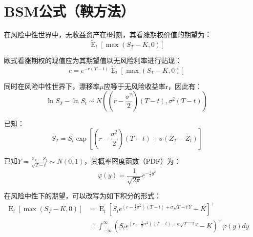 \documentclass[11pt]{article}
\newcommand{\E}{\operatorname{E}}
\begin{document}
\section{BSM公式（鞅方法）}

在风险中性世界中，无收益资产在$t$时刻，其看涨期权价值的期望为：
\begin{equation*}
    \tilde{\E}_t \left[ \max(S_T-K,0) \right]
\end{equation*}

欧式看涨期权的现值应为其期望值以无风险利率进行贴现：
\begin{equation*}
    c = e^{-r(T-t)} \tilde{\E}_t \left[ \max(S_T-K,0) \right]
\end{equation*}

同时在风险中性世界下，漂移率$\mu$应等于无风险收益率r，因此有：
\begin{equation*}
    \ln S_T - \ln S_t \sim N \left((r-\frac{\sigma^2}{2})(T-t), \sigma^2(T-t)\right)
\end{equation*}

已知：
\begin{equation*}
    S_T = S_t \exp\left[\left(r-\frac{\sigma^2}{2}\right)\left(T-t\right) + \sigma\left(Z_T - Z_t \right)\right]
\end{equation*}

已知$Y = \frac{Z_T - Z_t}{\sqrt{T-t}} \sim N(0,1)$，其概率密度函数（PDF）为：
\begin{equation*}
    \varphi(y) = \frac{1}{\sqrt{2\pi}} e^{-\frac{1}{2}y^2}
\end{equation*}

在风险中性下的期望，可以改写为如下积分的形式：
\begin{align*}
    \tilde{\E}_t \left[ \max(S_T-K,0) \right] & = \tilde{\E}_t \left[ S_t e^{(r-\frac{1}{2}\sigma^2)(T-t) + \sigma\sqrt{T-t}Y} - K \right]^+ \\
    & = \int_{-\infty}^{\infty} \left( S_t e^{(r-\frac{1}{2}\sigma^2)(T-t) + \sigma\sqrt{T-t}y} - K \right)^+ \varphi(y) dy
\end{align*}
\end{document}
